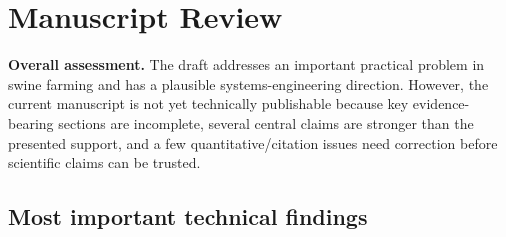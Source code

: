 \documentclass[11pt]{article}
\begin{document}
\section*{Manuscript Review}

\textbf{Overall assessment.} The draft addresses an important practical problem in swine farming and has a plausible systems-engineering direction. However, the current manuscript is not yet technically publishable because key evidence-bearing sections are incomplete, several central claims are stronger than the presented support, and a few quantitative/citation issues need correction before scientific claims can be trusted.

\subsection*{Most important technical findings}
\end{document}
